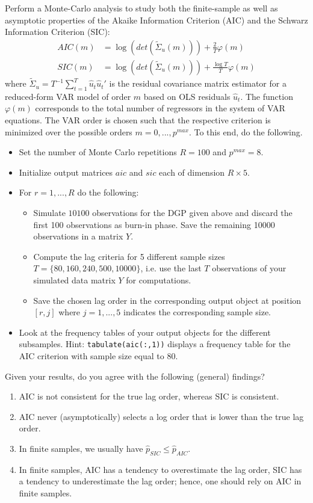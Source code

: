 \documentclass{article}
\begin{document}
Perform a Monte-Carlo analysis to study both the finite-sample as well as asymptotic properties of the Akaike Information Criterion (AIC) and the Schwarz Information Criterion (SIC):
\begin{align*}
AIC(m)  &= \log(det(\tilde{\Sigma}_u(m))) + \frac{2}{T}\varphi(m)\\
SIC(m)  &= \log(det(\tilde{\Sigma}_u(m))) + \frac{\log T}{T}\varphi(m)
\end{align*}
where $\tilde{\Sigma}_u=T^{-1}\sum_{t=1}^T \hat{u}_t\hat{u}_t'$ is the residual covariance matrix estimator for a reduced-form VAR model of order $m$ based on OLS residuals $\hat{u}_t$. The function $\varphi(m)$ corresponds to the total number of regressors in the system of VAR equations. The VAR order is chosen such that the respective criterion is minimized over the possible orders $m = 0,...,p^{max}$. To this end, do the following.

\begin{itemize}
	\item Set the number of Monte Carlo repetitions $R=100$ and $p^{max}=8$.
	\item Initialize output matrices $aic$ and $sic$ each of dimension $R \times 5$. 
	\item For $r=1,...,R$ do the following:
	\begin{itemize}
		\item Simulate $10100$ observations for the DGP given above and discard the first 100 observations as burn-in phase. Save the remaining 10000 observations in a matrix $Y$.
		\item Compute the lag criteria for 5 different sample sizes $T=\{80, 160, 240, 500, 10000\}$, i.e. use the last $T$ observations of your simulated data matrix $Y$ for computations.
		\item Save the chosen lag order in the corresponding output object at position $[r,j]$ where $j=1,...,5$ indicates the corresponding sample size.
	\end{itemize}
	\item Look at the frequency tables of your output objects for the different subsamples. Hint: \texttt{tabulate(aic(:,1))} displays a frequency table for the AIC criterion with sample size equal to 80.
\end{itemize}
Given your results, do you agree with the following (general) findings?
\begin{enumerate}
	\item AIC is not consistent for the true lag order, whereas SIC is consistent.
	\item AIC never (asymptotically) selects a log order that is lower than the true lag order.
	\item In finite samples, we usually have $\hat{p}_{SIC} \leq \hat{p}_{AIC}$.
	\item In finite samples, AIC has a tendency to overestimate the lag order, SIC has a tendency to underestimate the lag order; hence, one should rely on AIC in finite samples.
\end{enumerate}
\end{document}
